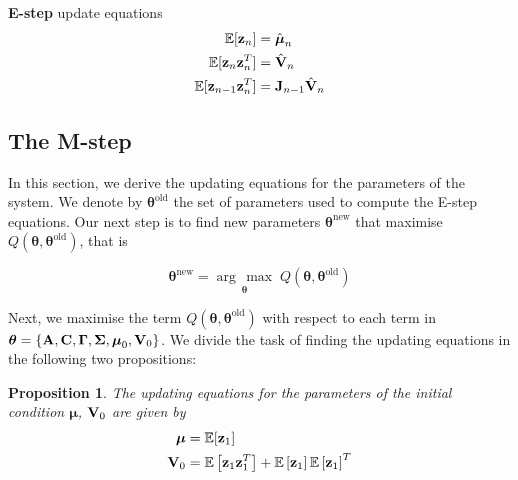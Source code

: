 \documentclass[11pt]{article}
\numberwithin{equation}{section}
\newcommand{\argmax}[1]{\underset{#1}{\operatorname{arg}\,\operatorname{max}}\;}
\newcommand{\expectation}[1]{\mathbb{E}\left[#1\right]}
\newcommand{\z}{{\bf z}}
\newtheorem{proposition}{Proposition}[section]
\begin{document}
\begin{tcolorbox}
\textbf{E-step} update equations
\begin{align}
	\mathbb{E}[\z_n] &= \hat{\boldsymbol{\mu}}_n\\
	\mathbb{E}[\z_n \z_n^T] &= \hat{{\bf V}}_n\\
	\mathbb{E}[\z_{n-1}\z_n^T] &= {\bf J}_{n-1}\hat{\bf V}_n
\end{align}
\end{tcolorbox}


\subsection{The M-step}
In this section, we derive the updating equations for the parameters of the system. We denote by $\boldsymbol{\theta}^\text{old}$ the set of parameters used to compute the E-step equations. Our next step is to find new parameters $\boldsymbol{\theta}^\text{new}$ that maximise $Q(\boldsymbol\theta, \boldsymbol\theta^\text{old})$, that is

\begin{equation}
	\boldsymbol{\theta}^\text{new} = \argmax{\boldsymbol\theta} Q(\boldsymbol\theta, \boldsymbol\theta^\text{old})
\end{equation}

Next, we maximise the term $Q(\boldsymbol\theta, \boldsymbol\theta^\text{old})$ with respect to each term in $\boldsymbol\theta = \{{\bf A}, {\bf C}, \boldsymbol\Gamma, \boldsymbol\Sigma, \boldsymbol\mu_0, {\bf V}_0\}$. We divide the task of finding the updating equations in the following two propositions:

\begin{proposition}
	The updating equations for the parameters of the initial condition $\boldsymbol{\mu}$, ${\bf V}_0$ are given by
	\begin{align}
		\boldsymbol{\mu} &= \mathbb{E}[{\z_1}] \\
		{\bf V}_0 &= \expectation{\z_1 \z_1^T} + \expectation{\z_1}\expectation{\z_1}^T
	\end{align}
\end{proposition}
\end{document}
